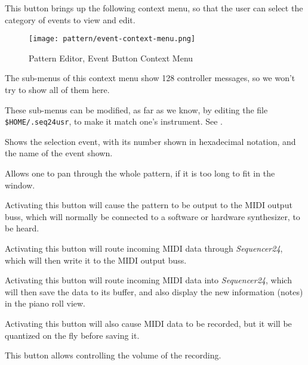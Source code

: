    \setcounter{ItemCounter}{0}      %

   This button brings up the following context menu, so that the user can
   select the category of events to view and edit.

\begin{figure}[H]
   \centering 
   \texttt{[image: pattern/event-context-menu.png]}
   \caption{Pattern Editor, Event Button Context Menu}
   \label{fig:pattern_editor_bottom_event_context_menu}
\end{figure}

   The sub-menus of this context menu show 128 controller messages,
   so we won't try to show all of them here.

   These sub-menus can be modified, as far as we know, by editing
   the file \texttt{\$HOME/.seq24usr}, to make it match one's instrument.
   See .

   Shows the selection event, with its number shown in hexadecimal notation,
   and the name of the event shown.

   Allows one to pan through the whole pattern, if it is too long to fit in
   the window.

   Activating this button will cause the pattern to be output to the MIDI
   output buss, which will normally be connected to a software or hardware
   synthesizer, to be heard.

   Activating this button will route incoming MIDI data through
   \textsl{Sequencer24}, which will then write it to the MIDI output buss.

   Activating this button will route incoming MIDI data into
   \textsl{Sequencer24}, which will then save the data to its buffer, and also
   display the new information (notes) in the piano roll view.

   Activating this button will also cause MIDI data to be recorded, but it
   will be quantized on the fly before saving it.

   This button allows controlling the volume of the recording.

